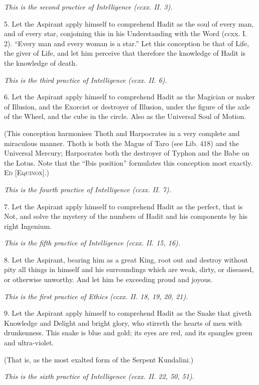 \textit{This is the second practice of Intelligence (ccxx. II. 3).}

5. Let the Aspirant apply himself to comprehend Hadit as the soul of every man, and of every star, conjoining this in his Understanding with the Word (ccxx. I. 2). \enquote{Every man and every woman is a star.} Let this conception be that of Life, the giver of Life, and let him perceive that therefore the knowledge of Hadit is the knowledge of death.

\textit{This is the third practice of Intelligence (ccxx. II. 6).}

6. Let the Aspirant apply himself to comprehend Hadit as the Magician or maker of Illusion, and the Exorcist or destroyer of Illusion, under the figure of the axle of the Wheel, and the cube in the circle. Also as the Universal Soul of Motion.

(This conception harmonises Thoth and Harpocrates in a very complete and miraculous manner. Thoth is both the Magus of Taro (see Lib. 418) and the Universal Mercury; Harpocrates both the destroyer of Typhon and the Babe on the Lotus. Note that the \enquote{Ibis position} formulates this conception most exactly. \textsc{Ed [Equinox]}.)

\textit{This is the fourth practice of Intelligence (ccxx. II. 7).}

7. Let the Aspirant apply himself to comprehend Hadit as the perfect, that is Not, and solve the mystery of the numbers of Hadit and his components by his right Ingenium.

\textit{This is the fifth practice of Intelligence (ccxx. II. 15, 16).}

8. Let the Aspirant, bearing him as a great King, root out and destroy without pity all things in himself and his surroundings which are weak, dirty, or diseased, or otherwise unworthy. And let him be exceeding proud and joyous.

\textit{This is the first practice of Ethics (ccxx. II. 18, 19, 20, 21).}

9. Let the Aspirant apply himself to comprehend Hadit as the Snake that giveth Knowledge and Delight and bright glory, who stirreth the hearts of men with drunkenness. This snake is blue and gold; its eyes are red, and its spangles green and ultra-violet.

(That is, as the most exalted form of the Serpent Kundalini.)

\textit{This is the sixth practice of Intelligence (ccxx. II. 22, 50, 51).}

